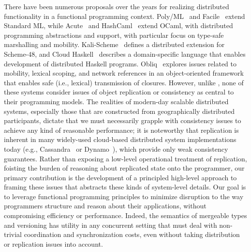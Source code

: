 There have been numerous proposals over the years for realizing
distributed functionality in a functional programming context.
Poly/ML~\cite{Mat97} and Facile~\cite{TLK+93} extend Standard ML,
while Acute~\cite{SLW+05} and HashCaml~\cite{BSS+06} extend OCaml, with
distributed programming abstractions and support, with particular
focus on type-safe marshalling and mobility.  Kali-Scheme~\cite{CJK95}
defines a distributed extension for Scheme-48, and Cloud
Haskell~\cite{EBPJ11} describes a domain-specific language that
enables development of distributed Haskell programs.
Obliq~\cite{Car95} explores issues related to mobility, lexical
scoping, and network references in an object-oriented framework that
enables safe (i.e., lexical) transmission of closures.  However,
unlike \name, none of these systems consider issues of object
replication or consistency as central to their programming models.
The realities of modern-day scalable distributed systems, especially
those that are constructed from geographically distributed
participants, dictate that we must necessarily grapple with
consistency issues to achieve any kind of reasonable performance; it
is noteworthy that replication is inherent in many widely-used
cloud-based distributed system implementations today (e.g.,
Cassandra~\cite{Cassandra} or Dynamo~\cite{Dynamo}), which provide
only weak consistency guarantees.  Rather than exposing a low-level
operational treatment of replication, foisting the burden of reasoning
about replicated state onto the programmer, our primary contribution
is the development of a principled high-level approach to framing
these issues that abstracts these kinds of system-level details.  Our
goal is to leverage functional programming principles to minimize
disruption to the way programmers structure and reason about their
applications, without compromising efficiency or performance.  Indeed,
the semantics of mergeable types and versioning has utility in any
concurrent setting that must deal with non-trivial coordination and
synchronization costs, even without taking distribution or replication
issues into account.

